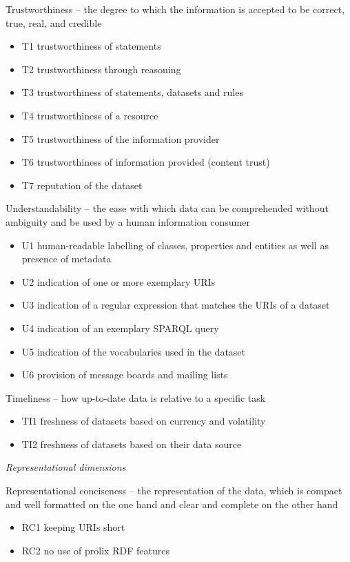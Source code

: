 Trustworthiness -- the degree to which the information is accepted to be correct, true, real, and credible
\begin{itemize}
 \setlength{\parskip}{0pt}
 \setlength{\itemsep}{0pt plus 1pt}
 \item T1 trustworthiness of statements
 \item T2 trustworthiness through reasoning
 \item T3 trustworthiness of statements, datasets and rules
 \item T4 trustworthiness of a resource
 \item T5 trustworthiness of the information provider
 \item T6 trustworthiness of information provided (content trust)
 \item T7 reputation of the dataset
\end{itemize}

Understandability -- the ease with which data can be comprehended without ambiguity and be used by a human information consumer
\begin{itemize}
 \setlength{\parskip}{0pt}
 \setlength{\itemsep}{0pt plus 1pt}
 \item U1 human-readable labelling of classes, properties and entities as well as presence of metadata
 \item U2 indication of one or more exemplary URIs
 \item U3 indication of a regular expression that matches the URIs of a dataset
 \item U4 indication of an exemplary SPARQL query
 \item U5 indication of the vocabularies used in the dataset
 \item U6 provision of message boards and mailing lists
\end{itemize}

Timeliness -- how up-to-date data is relative to a specific task
\begin{itemize}
 \setlength{\parskip}{0pt}
 \setlength{\itemsep}{0pt plus 1pt}
 \item TI1 freshness of datasets based on currency and volatility
 \item TI2 freshness of datasets based on their data source
\end{itemize}

\emph{Representational dimensions}

Representational conciseness -- the representation of the data, which is compact and well formatted on the one hand and clear and complete on the other hand
\begin{itemize}
 \setlength{\parskip}{0pt}
 \setlength{\itemsep}{0pt plus 1pt}
 \item RC1 keeping URIs short
 \item RC2 no use of prolix RDF features
\end{itemize}

